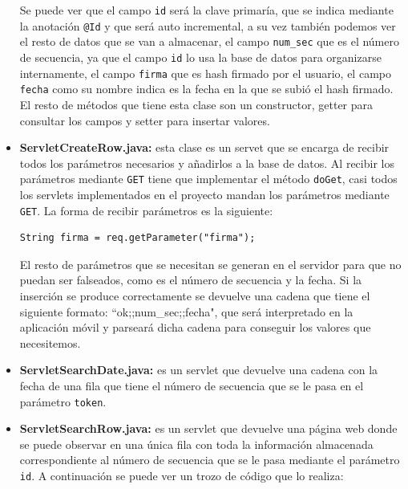 \begin{itemize}
Se puede ver que el campo \lstinline{id} será la clave primaría, que se indica mediante la anotación \lstinline{@Id} y que será auto incremental, a su vez también podemos ver el resto de datos que se van a almacenar, el campo \lstinline{num_sec} que es el número de secuencia, ya que el campo \lstinline{id} lo usa la base de datos para organizarse internamente, el campo \lstinline{firma} que es hash firmado por el usuario, el campo \lstinline{fecha} como su nombre indica es la fecha en la que se subió el hash firmado. El resto de métodos que tiene esta clase son un constructor, getter para consultar los campos y setter para insertar valores.

\item \textbf{ServletCreateRow.java:} esta clase es un servet que se encarga de recibir todos los parámetros necesarios y añadirlos a la base de datos. Al recibir los parámetros mediante \lstinline{GET} tiene que implementar el método \lstinline{doGet}, casi todos los servlets implementados en el proyecto mandan los parámetros mediante \lstinline{GET}. La forma de recibir parámetros es la siguiente:

\begin{lstlisting}[style=Java]
String firma = req.getParameter("firma");
\end{lstlisting}

El resto de parámetros que se necesitan se generan en el servidor para que no puedan ser falseados, como es el número de secuencia y la fecha. Si la inserción se produce correctamente se devuelve una cadena que tiene el siguiente formato: ``ok;;num\_sec;;fecha", que será interpretado en la aplicación móvil y parseará dicha cadena para conseguir los valores que necesitemos.


\item \textbf{ServletSearchDate.java:} es un servlet que devuelve una cadena con la fecha de una fila que tiene el número de secuencia que se le pasa en el parámetro \lstinline{token}.

\item \textbf{ServletSearchRow.java:} es un servlet que devuelve una página web donde se puede observar en una única fila con toda la información almacenada correspondiente al número de secuencia que se le pasa mediante el parámetro \lstinline{id}. A continuación se puede ver un trozo de código que lo realiza:


\end{itemize}
